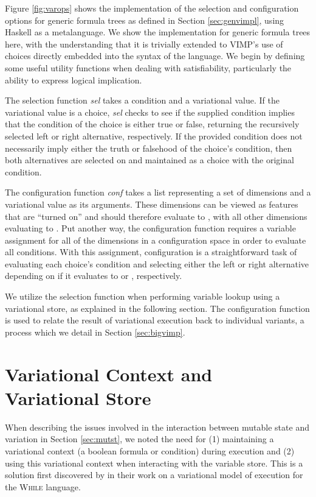 \documentclass[12pt,oneside]{book}
\begin{document}
Figure \ref{fig:varops} shows the implementation of the selection and configuration options for generic formula trees
as defined in Section \ref{sec:genvimpl}, using Haskell as a metalanguage. We show the implementation for generic formula trees
here, with the understanding that it is trivially extended to VIMP's use of choices directly embedded into the syntax of the language.
We begin by defining some useful utility functions when dealing with satisfiability, particularly the ability to express logical implication.

The selection function \emph{sel} takes a condition and a variational value. If the variational value is a choice, \emph{sel} checks to see
if the supplied condition implies that the condition of the choice is either true or false, returning the recursively selected left or right alternative, respectively.
If the provided condition does not necessarily imply either the truth or falsehood of the choice's condition, then both alternatives are selected on
and maintained as a choice with the original condition.

The configuration function \emph{conf} takes a list representing a set of dimensions and a variational value as its arguments. These dimensions can be viewed as
features that are ``turned on'' and should therefore evaluate to , with all other dimensions evaluating to . Put another way, the configuration
function requires a variable assignment for all of the dimensions in a configuration space in order to evaluate all conditions. With this assignment, configuration
is a straightforward task of evaluating each choice's condition and selecting either the left or right alternative depending on if it evaluates to  or , respectively.

We utilize the selection function when performing variable lookup using a variational store, as explained in the following section. The configuration function is used to
relate the result of variational execution back to individual variants, a process which we detail in Section \ref{sec:bigvimp}.

\section{Variational Context and Variational Store}
\label{sec:vcvs}

When describing the issues involved in the interaction between mutable state and variation in Section \ref{sec:mutst}, we noted the need for (1) maintaining a variational context
(a boolean formula or condition)
during execution and (2) using this variational context when interacting with the variable store. This is a solution first discovered by \cite{varwhile} in their work on a
variational model of execution for the \textsc{While} language.
\end{document}
